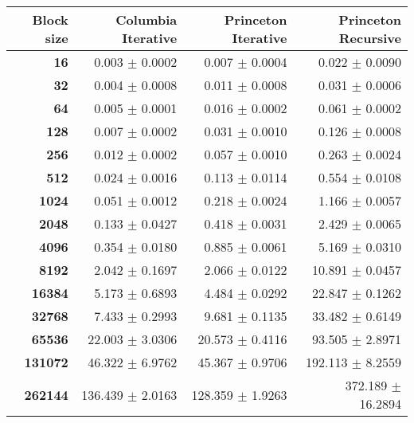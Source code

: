 \begin{tabular}{rrrr}\toprule
\textbf{Block size}  & \textbf{Columbia Iterative} & \textbf{Princeton Iterative} & \textbf{Princeton Recursive} \\\midrule
\textbf{16}     & 0.003 $\pm$ 0.0002 & 0.007 $\pm$ 0.0004 & 0.022 $\pm$ 0.0090        \\
\textbf{32}     & 0.004 $\pm$ 0.0008 & 0.011 $\pm$ 0.0008 & 0.031 $\pm$ 0.0006        \\
\textbf{64}     & 0.005 $\pm$ 0.0001 & 0.016 $\pm$ 0.0002 & 0.061 $\pm$ 0.0002        \\
\textbf{128}    & 0.007 $\pm$ 0.0002 & 0.031 $\pm$ 0.0010 & 0.126 $\pm$ 0.0008        \\
\textbf{256}    & 0.012 $\pm$ 0.0002 & 0.057 $\pm$ 0.0010 & 0.263 $\pm$ 0.0024        \\
\textbf{512}    & 0.024 $\pm$ 0.0016 & 0.113 $\pm$ 0.0114 & 0.554 $\pm$ 0.0108        \\
\textbf{1024}   & 0.051 $\pm$ 0.0012 & 0.218 $\pm$ 0.0024 & 1.166 $\pm$ 0.0057        \\
\textbf{2048}   & 0.133 $\pm$ 0.0427 & 0.418 $\pm$ 0.0031 & 2.429 $\pm$ 0.0065        \\
\textbf{4096}   & 0.354 $\pm$ 0.0180 & 0.885 $\pm$ 0.0061 & 5.169 $\pm$ 0.0310        \\
\textbf{8192}   & 2.042 $\pm$ 0.1697 & 2.066 $\pm$ 0.0122 & 10.891 $\pm$ 0.0457       \\
\textbf{16384}  & 5.173 $\pm$ 0.6893 & 4.484 $\pm$ 0.0292 & 22.847 $\pm$ 0.1262       \\
\textbf{32768}  & 7.433 $\pm$ 0.2993 & 9.681 $\pm$ 0.1135 & 33.482 $\pm$ 0.6149       \\
\textbf{65536}  & 22.003 $\pm$ 3.0306 & 20.573 $\pm$ 0.4116 & 93.505 $\pm$ 2.8971     \\
\textbf{131072} & 46.322 $\pm$ 6.9762 & 45.367 $\pm$ 0.9706 & 192.113 $\pm$ 8.2559    \\
\textbf{262144} & 136.439 $\pm$ 2.0163 & 128.359 $\pm$ 1.9263 & 372.189 $\pm$ 16.2894 \\
\bottomrule
\end{tabular}
